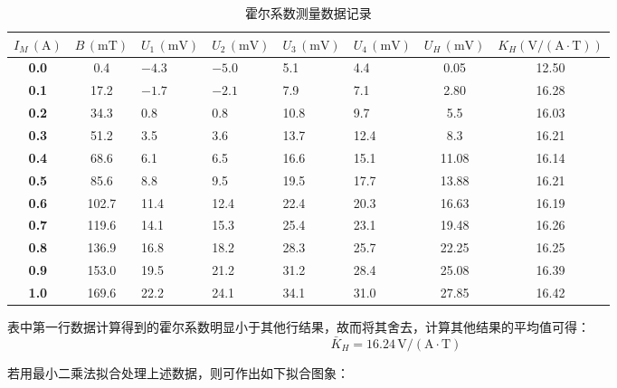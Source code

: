 \documentclass[UTF-8,twoside,cs4size]{ctexart}
\begin{document}
	\begin{table}[!h]
		\centering
		\renewcommand\arraystretch{1.5}
		\caption{霍尔系数测量数据记录}
		\begin{tabularx}{\textwidth}{|c|c|Y|Y|Y|Y|c|c|}
			\hline
			$ I_M\,(\mathrm A) $&$ B\,(\mathrm{mT}) $&$ U_1\,(\mathrm{mV}) $&$ U_2\,(\mathrm{mV}) $&$ U_3\,(\mathrm{mV}) $&$ U_4\,(\mathrm{mV}) $&$ U_H\,(\mathrm{mV}) $&$ K_H(\mathrm{V/(A\cdot T)}) $\\
			\hline
			\textbf{0.0}&0.4&$ -4.3 $&$ -5.0 $&5.1&4.4&0.05&12.50\\
			\hline
			\textbf{0.1}&17.2&$ -1.7 $&$ -2.1 $&7.9&7.1&2.80&16.28\\
			\hline
			\textbf{0.2}&34.3&0.8&0.8&10.8&9.7&5.5&16.03\\
			\hline
			\textbf{0.3}&51.2&3.5&3.6&13.7&12.4&8.3&16.21\\
			\hline
			\textbf{0.4}&68.6&6.1&6.5&16.6&15.1&11.08&16.14\\
			\hline
			\textbf{0.5}&85.6&8.8&9.5&19.5&17.7&13.88&16.21\\
			\hline
			\textbf{0.6}&102.7&11.4&12.4&22.4&20.3&16.63&16.19\\
			\hline
			\textbf{0.7}&119.6&14.1&15.3&25.4&23.1&19.48&16.26\\
			\hline
			\textbf{0.8}&136.9&16.8&18.2&28.3&25.7&22.25&16.25\\
			\hline
			\textbf{0.9}&153.0&19.5&21.2&31.2&28.4&25.08&16.39\\
			\hline
			\textbf{1.0}&169.6&22.2&24.1&34.1&31.0&27.85&16.42\\
			\hline
		\end{tabularx}
	\end{table}
	
	表中第一行数据计算得到的霍尔系数明显小于其他行结果，故而将其舍去，计算其他结果的平均值可得：
	\[\bar K_H=16.24\,\mathrm{V/(A\cdot T)}\]
		
	若用最小二乘法拟合处理上述数据，则可作出如下拟合图象：
	
\end{document}
